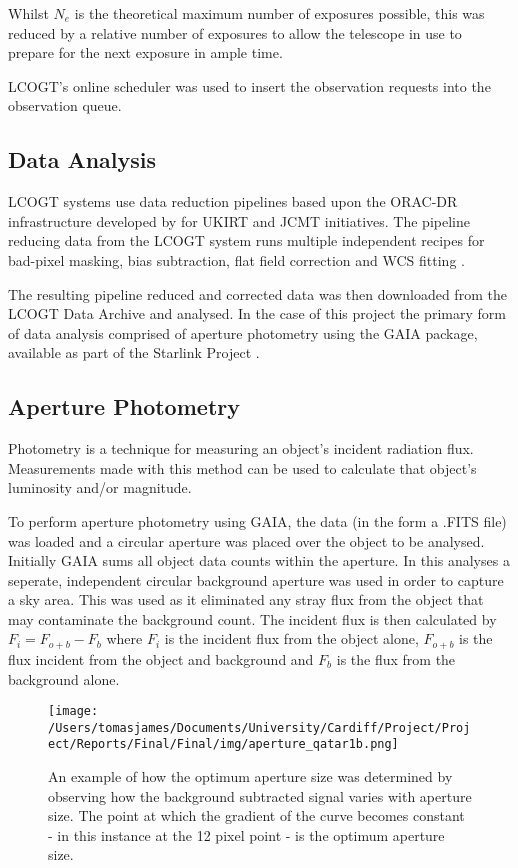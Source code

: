 \documentclass{report}
\begin{document}
Whilst $N_{e}$ is the theoretical maximum number of exposures possible, this was reduced by a relative number of exposures to allow the telescope in use to prepare for the next exposure in ample time. 

LCOGT's online scheduler was used to insert the observation requests into the observation queue.

\subsection{Data Analysis}
LCOGT systems use data reduction pipelines based upon the ORAC-DR infrastructure developed by \textcite{orac-dr} for UKIRT and JCMT initiatives. The pipeline reducing data from the LCOGT system runs multiple independent recipes for bad-pixel masking, bias subtraction, flat field correction and WCS fitting \parencite{pipeline}.  

The resulting pipeline reduced and corrected data was then downloaded from the LCOGT Data Archive and analysed. In the case of this project the primary form of data analysis comprised of aperture photometry using the GAIA package, available as part of the Starlink Project \parencite{starlink}.

\subsection{Aperture Photometry}
Photometry is a technique for measuring an object's incident radiation flux. Measurements made with this method can be used to calculate that object's luminosity and/or magnitude.

To perform aperture photometry using GAIA, the data (in the form a .FITS file) was loaded and a circular aperture was placed over the object to be analysed. Initially GAIA sums all object data counts within the aperture. In this analyses a seperate, independent circular background aperture was used in order to capture a sky area. This was used as it eliminated any stray flux from the object that may contaminate the background count. The incident flux is then calculated by $F_{i} = F_{o+b} - F_{b}$ where $F_{i}$ is the incident flux from the object alone, $F_{o+b}$ is the flux incident from the object and background and $F_{b}$ is the flux from the background alone.

\begin{figure}[H]
\centering
    \texttt{[image: /Users/tomasjames/Documents/University/Cardiff/Project/Project/Reports/Final/Final/img/aperture\_qatar1b.png]}
\caption[An example of how the optimum aperture size was determined by observing how the background subtracted signal varies with aperture size. The point at which the gradient of the curve becomes constant - in this instance at the 12 pixel point - is the optimum aperture size.]{An example of how the optimum aperture size was determined by observing how the background subtracted signal varies with aperture size. The point at which the gradient of the curve becomes constant - in this instance at the 12 pixel point - is the optimum aperture size.} \label{qatar1b}
\end{figure}
\end{document}
